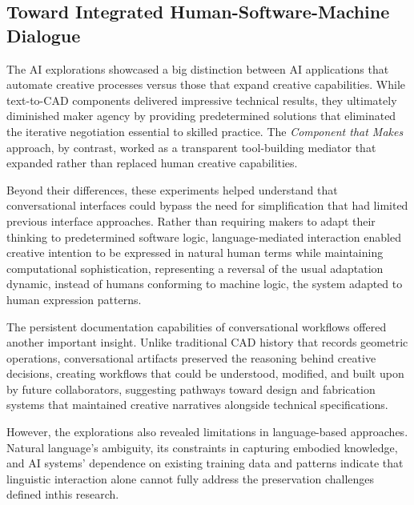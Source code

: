 \subsection{Toward Integrated Human-Software-Machine Dialogue}

The AI explorations showcased a big distinction between AI applications that automate creative processes versus those that expand creative capabilities. While text-to-CAD components delivered impressive technical results, they ultimately diminished maker agency by providing predetermined solutions that eliminated the iterative negotiation essential to skilled practice. The \textit{Component that Makes} approach, by contrast, worked as a transparent tool-building mediator that expanded rather than replaced human creative capabilities.

\vspace{0.5cm}

Beyond their differences, these experiments helped understand that conversational interfaces could bypass the need for simplification that had limited previous interface approaches. Rather than requiring makers to adapt their thinking to predetermined software logic, language-mediated interaction enabled creative intention to be expressed in natural human terms while maintaining computational sophistication, representing a reversal of the usual adaptation dynamic, instead of humans conforming to machine logic, the system adapted to human expression patterns.

\vspace{0.5cm}

The persistent documentation capabilities of conversational workflows offered another important insight. Unlike traditional CAD history that records geometric operations, conversational artifacts preserved the reasoning behind creative decisions, creating workflows that could be understood, modified, and built upon by future collaborators, suggesting pathways toward design and fabrication systems that maintained creative narratives alongside technical specifications.

\vspace{0.5cm}

However, the explorations also revealed limitations in language-based approaches. Natural language's ambiguity, its constraints in capturing embodied knowledge, and AI systems' dependence on existing training data and patterns indicate that linguistic interaction alone cannot fully address the preservation challenges defined inthis research. 

